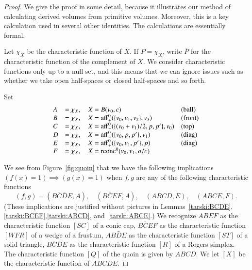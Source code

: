 \begin{proof} We give the proof in some detail, because it illustrates
our method of calculating derived volumes from primitive volumes.  Moreover,
this is a key calculation used in several other identities.
The calculations are essentially formal.

Let $\chi_X$ be the characteristic
function of $X$.  If $P = \chi_X$, write $\bar P$ for the characteristic
function of the complement of $X$.  We consider characteristic functions
only up to a null set, and this means that we can ignore issues such
as whether we take open half-spaces or closed half-spaces and so forth.

Set
$$
\begin{array}{llll}
  A &= \chi_X,\quad X = B(v_0,c)&\text{(ball)}\\
  B &= \chi_X,\quad X = {\operatorname{aff}}_+^0(\{v_0,v_1,v_2\},v_3)&\text{(front)}\\
  C &= \chi_X,\quad X = {\operatorname{aff}}_-^0(\{(v_0+v_1)/2,p,p'\},v_0)
    &\text{(top)}\\
  D &= \chi_X,\quad X = {\operatorname{aff}}_-^0(\{v_0,p,p'\},v_1)&\text{(diag)}\\
  E &= \chi_X,\quad X = {\operatorname{aff}}_+^0(\{v_0,v_1,p'\},p)&\text{(diag)}\\
  F &= \chi_X,\quad X = {\operatorname{rcone}}^0(v_0,v_1,a/c)\\
\end{array}
$$

We see from Figure~\ref{fig:quoin} that we have the following implications
$(f(x)=1)\implies (g(x)=1)$ when $f,g$ are any of the following characteristic
functions
  $$
   (f,g) = (B\bar C \bar D E,A),\quad
   (B\bar C E F,A),\quad (A B C D, E),\quad (A B C E,F).
  $$
(These implications are justified without pictures in Lemmas~\ref{tarski:BCDE},\ref{tarski:BCEF},\ref{tarski:ABCD}, and~\ref{tarski:ABCE}.)
We recognize $ABEF$ as the characteristic function $[SC]$ of a
conic cap, $B\bar C E F$ as the characteristic function $[WFR]$ of a
wedge of a frustum,  $AB\bar D E$ as the characteristic function $[ST]$
of a solid triangle, $B\bar C\bar D E$ as the characteristic function $[R]$
of a Rogers simplex.  The characteristic function $[Q]$
of the quoin is given
by $A B C D$.  We let $[X]$ be the characteristic function of
$A B C \bar D E$.


\end{proof}
